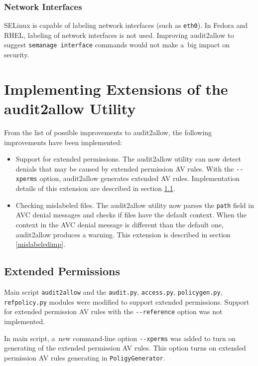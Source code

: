 \subsection{Network Interfaces}
SELinux is capable of labeling network interfaces (such as \texttt{eth0}). In
Fedora and RHEL, labeling of network interfaces is not used. Improving
audit2allow to suggest \texttt{semanage interface} commands would not make a~big
impact on security.

\chapter{Implementing Extensions of the audit2allow Utility}
\label{impl}
From the list of possible improvements to audit2allow, the following
improvements have been implemented:
\begin{itemize}
    \item Support for extended permissions. The audit2allow utility can now
        detect denials that may be caused by extended permission AV rules. With
        the \texttt{-{}-xperms} option, audit2allow generates extended AV rules.
        Implementation details of this extension are described in section
        \ref{xpermsimp}.
    \item Checking mislabeled files. The audit2allow utility now parses the
        \texttt{path} field in AVC denial messages and checks if files have the
        default context. When the context in the AVC denial message is different
        than the default one, audit2allow produces a warning. This extension is
        described in section \ref{mislabeledimp}.
\end{itemize}

\section{Extended Permissions}
\label{xpermsimp}
Main script \texttt{audit2allow} and the \texttt{audit.py}, \texttt{access.py},
\texttt{policygen.py}, \texttt{refpolicy.py} modules were modified to support
extended permissions. Support for extended permission AV rules with the
\texttt{-{}-reference} option was not implemented.

In main script, a~new command-line option \texttt{-{}-xperms} was added to turn
on generating of the extended permission AV rules. This option turns on extended
permission AV rules generating in \texttt{PoligyGenerator}.

